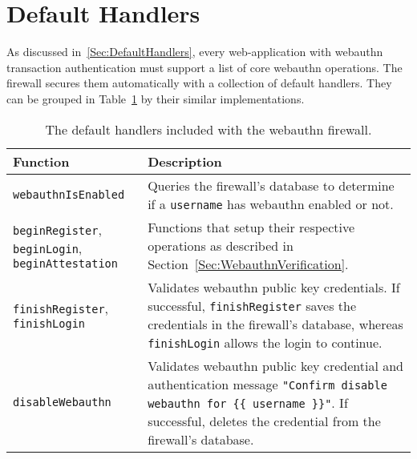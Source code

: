 \section{Default Handlers}

As discussed in~\ref{Sec:DefaultHandlers}, every web-application with webauthn transaction authentication must support a list of core webauthn operations. The firewall secures them automatically with a collection of default handlers. They can be grouped in Table~\ref{Table:Implementation_DefaultHandlers} by their similar implementations.


\begin{table}[h]
\centering

\begin{tabular}{ m{3cm} m{11cm}  } 
 \hline
 Function & Description \\ 
 \hline \hline

 \lstinline|webauthnIsEnabled| & Queries the firewall's database to determine if a \lstinline|username| has webauthn enabled or not. \\ \hline

 \lstinline|beginRegister|, \lstinline|beginLogin|, \lstinline|beginAttestation| & Functions that setup their respective operations as described in Section~\ref{Sec:WebauthnVerification}. \\ \hline

 \lstinline|finishRegister|, \lstinline|finishLogin| & Validates webauthn public key credentials. If successful, \lstinline|finishRegister| saves the credentials in the firewall's database, whereas \lstinline|finishLogin| allows the login to continue. \\ \hline

 \lstinline|disableWebauthn| & Validates webauthn public key credential and authentication message \lstinline|"Confirm disable webauthn for {{ username }}"|. If successful, deletes the credential from the firewall's database. \\ \hline

\end{tabular}
\caption{The default handlers included with the webauthn firewall.}
\label{Table:Implementation_DefaultHandlers}
\end{table}

